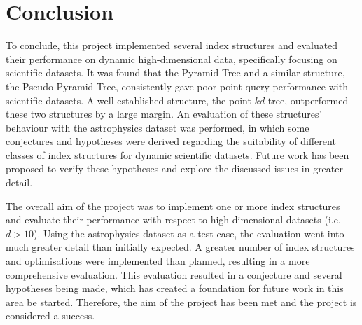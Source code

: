 \section{Conclusion}

To conclude, this project implemented several index structures and evaluated their performance on dynamic high-dimensional data, specifically focusing on scientific datasets. It was found that the Pyramid Tree and a similar structure, the Pseudo-Pyramid Tree, consistently gave poor point query performance with scientific datasets. A well-established structure, the point $kd$-tree, outperformed these two structures by a large margin. An evaluation of these structures' behaviour with the astrophysics dataset was performed, in which some conjectures and hypotheses were derived regarding the suitability of different classes of index structures for dynamic scientific datasets. Future work has been proposed to verify these hypotheses and explore the discussed issues in greater detail.

The overall aim of the project was to implement one or more index structures and evaluate their performance with respect to high-dimensional datasets (i.e. $d > 10$). Using the astrophysics dataset as a test case, the evaluation went into much greater detail than initially expected. A greater number of index structures and optimisations were implemented than planned, resulting in a more comprehensive evaluation. This evaluation resulted in a conjecture and several hypotheses being made, which has created a foundation for future work in this area be started. Therefore, the aim of the project has been met and the project is considered a success.